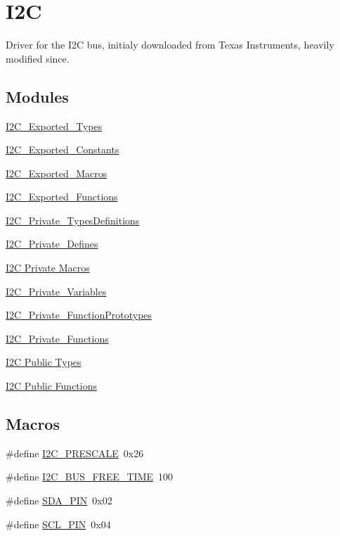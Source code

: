 \hypertarget{group___i2_c}{}\section{I2C}
\label{group___i2_c}


Driver for the I2C bus, initialy downloaded from Texas Instruments, heavily modified since.  


\subsection*{Modules}
\begin{DoxyCompactItemize}
\item 
\hyperlink{group___i2_c___exported___types}{I2\+C\+\_\+\+Exported\+\_\+\+Types}
\item 
\hyperlink{group___i2_c___exported___constants}{I2\+C\+\_\+\+Exported\+\_\+\+Constants}
\item 
\hyperlink{group___i2_c___exported___macros}{I2\+C\+\_\+\+Exported\+\_\+\+Macros}
\item 
\hyperlink{group___i2_c___exported___functions}{I2\+C\+\_\+\+Exported\+\_\+\+Functions}
\item 
\hyperlink{group___i2_c___private___types_definitions}{I2\+C\+\_\+\+Private\+\_\+\+Types\+Definitions}
\item 
\hyperlink{group___i2_c___private___defines}{I2\+C\+\_\+\+Private\+\_\+\+Defines}
\item 
\hyperlink{group___i2_c___private___macros}{I2\+C Private Macros}
\item 
\hyperlink{group___i2_c___private___variables}{I2\+C\+\_\+\+Private\+\_\+\+Variables}
\item 
\hyperlink{group___i2_c___private___function_prototypes}{I2\+C\+\_\+\+Private\+\_\+\+Function\+Prototypes}
\item 
\hyperlink{group___i2_c___private___functions}{I2\+C\+\_\+\+Private\+\_\+\+Functions}
\item 
\hyperlink{group___i2_c___public___types}{I2\+C Public Types}
\item 
\hyperlink{group___i2_c___public___functions}{I2\+C Public Functions}
\end{DoxyCompactItemize}
\subsection*{Macros}
\begin{DoxyCompactItemize}
\item 
\#define \hyperlink{group___i2_c_gafb9001a03955fc02cf3bbf44bcd8d975}{I2\+C\+\_\+\+P\+R\+E\+S\+C\+A\+LE}~0x26
\item 
\#define \hyperlink{group___i2_c_gad5f4d29f56fdf15e6d198a3383dfcc0f}{I2\+C\+\_\+\+B\+U\+S\+\_\+\+F\+R\+E\+E\+\_\+\+T\+I\+ME}~100
\item 
\#define \hyperlink{group___i2_c_ga526d580d324bce60a3e964066fae77e3}{S\+D\+A\+\_\+\+P\+IN}~0x02
\item 
\#define \hyperlink{group___i2_c_ga06c967e78bcedcee909a70764f879433}{S\+C\+L\+\_\+\+P\+IN}~0x04
\end{DoxyCompactItemize}
